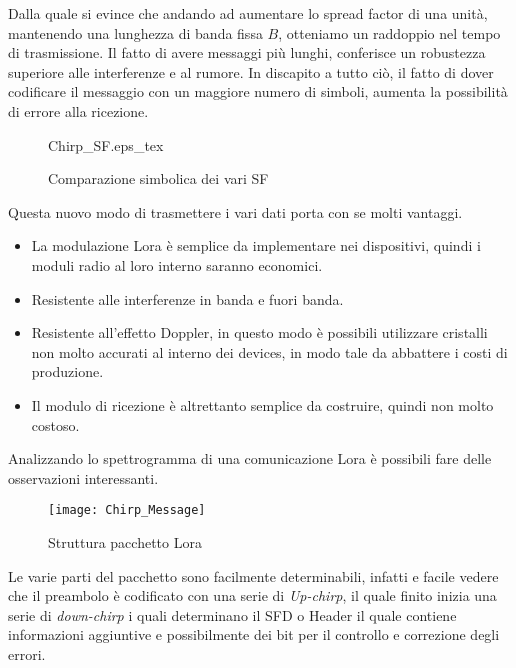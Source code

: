 Dalla quale si evince che andando ad aumentare lo spread factor di una unità,
mantenendo una lunghezza di banda fissa $B$, otteniamo un raddoppio nel tempo di
trasmissione. Il fatto di avere messaggi più lunghi, conferisce un robustezza
superiore alle interferenze e al rumore. In discapito a tutto ciò, il fatto di
dover codificare il messaggio con un maggiore numero di simboli, aumenta la
possibilità di errore alla ricezione. 

\begin{figure}[h]
\centering 
{Chirp_SF.eps_tex}
\caption{Comparazione simbolica dei vari SF}
\end{figure}

Questa nuovo modo di trasmettere i vari dati porta con se molti vantaggi.
\begin{itemize}
\item La modulazione Lora è semplice da implementare nei dispositivi, quindi i
moduli radio al loro interno saranno economici.
\item Resistente alle interferenze in banda e fuori banda.
\item Resistente  all'effetto Doppler, in questo modo è possibili utilizzare
cristalli non molto accurati al interno dei devices, in modo tale da abbattere i
costi di produzione.
\item Il modulo di ricezione è altrettanto semplice da costruire, quindi non
molto costoso.
\end{itemize}

Analizzando lo spettrogramma di una comunicazione Lora è possibili fare delle
osservazioni interessanti. 

\begin{figure}[h]
\centering 
\texttt{[image: Chirp\_Message]}
\caption{Struttura pacchetto Lora }
\end{figure}

Le varie parti del pacchetto  sono facilmente determinabili, infatti e facile
vedere che il preambolo è codificato con una serie di \emph{Up-chirp}, il quale
finito inizia una serie di \emph{down-chirp} i quali determinano il SFD o Header
il quale contiene informazioni aggiuntive e possibilmente dei bit per il
controllo e correzione degli errori.

